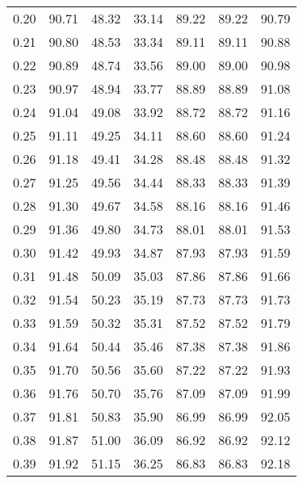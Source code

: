 \begin{tabular}{|c|c|c|c|c|c|c|}
      0.20 &     90.71 &     48.32 &      33.14 &   89.22 &      89.22 &         90.79 \\
      0.21 &     90.80 &     48.53 &      33.34 &   89.11 &      89.11 &         90.88 \\
      0.22 &     90.89 &     48.74 &      33.56 &   89.00 &      89.00 &         90.98 \\
      0.23 &     90.97 &     48.94 &      33.77 &   88.89 &      88.89 &         91.08 \\
      0.24 &     91.04 &     49.08 &      33.92 &   88.72 &      88.72 &         91.16 \\
      0.25 &     91.11 &     49.25 &      34.11 &   88.60 &      88.60 &         91.24 \\
      0.26 &     91.18 &     49.41 &      34.28 &   88.48 &      88.48 &         91.32 \\
      0.27 &     91.25 &     49.56 &      34.44 &   88.33 &      88.33 &         91.39 \\
      0.28 &     91.30 &     49.67 &      34.58 &   88.16 &      88.16 &         91.46 \\
      0.29 &     91.36 &     49.80 &      34.73 &   88.01 &      88.01 &         91.53 \\
      0.30 &     91.42 &     49.93 &      34.87 &   87.93 &      87.93 &         91.59 \\
      0.31 &     91.48 &     50.09 &      35.03 &   87.86 &      87.86 &         91.66 \\
      0.32 &     91.54 &     50.23 &      35.19 &   87.73 &      87.73 &         91.73 \\
      0.33 &     91.59 &     50.32 &      35.31 &   87.52 &      87.52 &         91.79 \\
      0.34 &     91.64 &     50.44 &      35.46 &   87.38 &      87.38 &         91.86 \\
      0.35 &     91.70 &     50.56 &      35.60 &   87.22 &      87.22 &         91.93 \\
      0.36 &     91.76 &     50.70 &      35.76 &   87.09 &      87.09 &         91.99 \\
      0.37 &     91.81 &     50.83 &      35.90 &   86.99 &      86.99 &         92.05 \\
      0.38 &     91.87 &     51.00 &      36.09 &   86.92 &      86.92 &         92.12 \\
      0.39 &     91.92 &     51.15 &      36.25 &   86.83 &      86.83 &         92.18 \\

\end{tabular}
